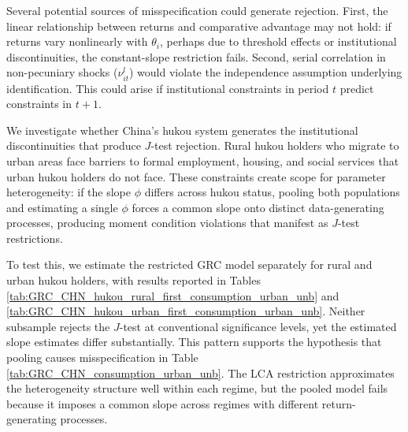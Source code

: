 Several potential sources of misspecification could generate rejection. 
First, the linear relationship between returns and comparative advantage may not hold: if returns vary nonlinearly with $\theta_i$, perhaps due to threshold effects or institutional discontinuities, the constant-slope restriction fails.
Second, serial correlation in non-pecuniary shocks ($\nu_{it}^l$) would violate the independence assumption underlying identification. 
This could arise if institutional constraints in period $t$ predict constraints in $t+1$.

We investigate whether China's hukou system generates the institutional discontinuities that produce $J$-test rejection.
Rural hukou holders who migrate to urban areas face barriers to formal employment, housing, and social services that urban hukou holders do not face.
These constraints create scope for parameter heterogeneity: if the slope $\phi$ differs across hukou status, pooling both populations and estimating a single $\phi$ forces a common slope onto distinct data-generating processes, producing moment condition violations that manifest as $J$-test restrictions.


To test this, we estimate the restricted GRC model separately for rural and urban hukou holders, with results reported in Tables \ref{tab:GRC_CHN_hukou_rural_first_consumption_urban_unb} and \ref{tab:GRC_CHN_hukou_urban_first_consumption_urban_unb}. 
Neither subsample rejects the $J$-test at conventional significance levels, yet the estimated slope estimates differ substantially. %
This pattern supports the hypothesis that pooling causes misspecification in Table \ref{tab:GRC_CHN_consumption_urban_unb}.
The LCA restriction approximates the heterogeneity structure well within each regime, but the pooled model fails because it imposes a common slope across regimes with different return-generating processes.



